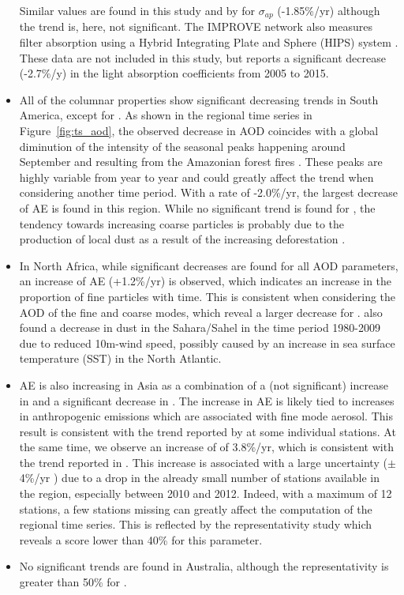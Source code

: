 \documentclass[acp, manuscript]{copernicus}
\begin{document}
\begin{itemize}
 Similar values are found in this study and by \cite{collaudcoen-2019} for $\sigma_{ap}$ (-1.85\%/yr) although the trend is, here, not significant. The IMPROVE network also measures filter absorption using a Hybrid Integrating Plate and Sphere (HIPS) system \citep{Warren2016}. These data are not included in this study, but \cite{Warren2016} reports a significant decrease (-2.7\%/y) in the light absorption coefficients from 2005 to 2015.
 \item All of the columnar properties show significant decreasing trends in South America, except for . As shown in the regional time series in Figure~\ref{fig:ts_aod}, the observed decrease in AOD coincides with a global diminution of the intensity of the seasonal peaks happening around September and resulting from the Amazonian forest fires \citep{aragao201821st}. These peaks are highly variable from year to year and could greatly affect the trend when considering another time period. With a rate of -2.0\%/yr, the largest decrease of AE is found in this region. While no significant trend is found for , the tendency towards increasing coarse particles is probably due to the production of local dust as a result of the increasing deforestation \citep{werth2002local,betts2008effects}.
 \item In North Africa, while significant decreases are found for all AOD parameters, an increase of AE (+1.2\%/yr) is observed, which indicates an increase in the proportion of fine particles with time. This is consistent when considering the AOD of the fine and coarse modes, which reveal a larger decrease for . \cite{chin2014multi} also found a decrease in dust in the Sahara/Sahel in the time period 1980-2009 due to reduced 10m-wind speed, possibly caused by an increase in sea surface temperature (SST) in the North Atlantic.
 \item AE is also increasing in Asia as a combination of a (not significant) increase in  and a significant decrease in . The increase in AE is likely tied to increases in anthropogenic emissions which are associated with fine mode aerosol. This result is consistent with the trend reported by \cite{yoon2012trend} at some individual stations. At the same time, we observe an increase of  of 3.8\%/yr, which is consistent with the trend reported in \cite{aas2019global}. This increase is associated with a large uncertainty ($\pm$4\%/yr ) due to a drop in the already small number of stations available in the region, especially between 2010 and 2012. Indeed, with a maximum of 12 stations, a few stations missing can greatly affect the computation of the regional time series. This is reflected by the representativity study which reveals a score lower than 40\% for this parameter. 
 \item No significant trends are found in Australia, although the representativity is greater than 50\% for .

\end{itemize}
\end{document}

